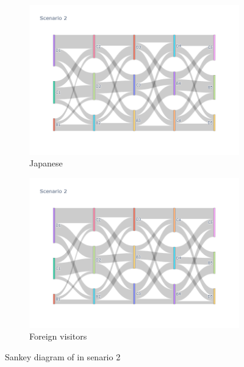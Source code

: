 \begin{figure}[h]
  \begin{subfigure}{0.5\textwidth}
    \centering
    \includegraphics[width=\textwidth]{Figure/Figure26b.jpg}
    \caption{Japanese}
  \end{subfigure}
  \begin{subfigure}{0.5\textwidth}
    \centering
    \includegraphics[width=\linewidth]{Figure/Figure27b.jpg}
    \caption{Foreign visitors}
  \end{subfigure}
  \caption{Sankey diagram of in senario 2 }
  \label{fig26b}
\end{figure}

